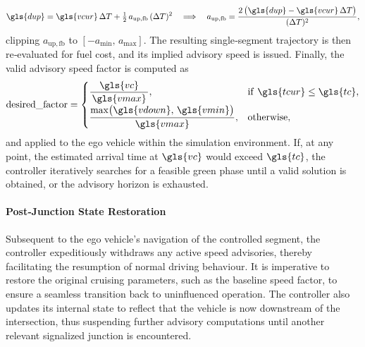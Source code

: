 \begin{equation}
    \gls{dup}
    = \gls{vcur}\,\Delta T 
    + \tfrac{1}{2}\,a_{\mathrm{up,fb}}\,(\Delta T)^2
    \quad\Longrightarrow\quad
    a_{\mathrm{up,fb}}
    = \frac{2\,\bigl(\gls{dup} - \gls{vcur}\,\Delta T\bigr)}{(\Delta T)^2},
\end{equation}
clipping $a_{\mathrm{up,fb}}$ to $[-a_{\min},\,a_{\max}]$. The resulting single‐segment trajectory is then re‐evaluated for fuel cost, and its implied advisory speed is issued.
\mynewline
Finally, the valid advisory speed factor is computed as
\begin{equation}
\text{desired\_factor} =
\begin{cases}
\dfrac{\gls{vc}}{\,\gls{vmax}\,}, 
& \text{if } \gls{tcur} \leq \gls{tc}, \\[6pt]
\dfrac{\max\bigl(\gls{vdown},\,\gls{vmin}\bigr)}{\,\gls{vmax}\,}, 
& \text{otherwise},
\end{cases}
\end{equation}
and applied to the ego vehicle within the simulation environment. If, at any point, the estimated arrival time at $\gls{vc}$ would exceed $\gls{tc}$, the controller iteratively searches for a feasible green phase until a valid solution is obtained, or the advisory horizon is exhausted.

\paragraph{Post‐Junction State Restoration}
Subsequent to the ego vehicle's navigation of the controlled segment, the controller expeditiously withdraws any active speed advisories, thereby facilitating the resumption of normal driving behaviour. It is imperative to restore the original cruising parameters, such as the baseline speed factor, to ensure a seamless transition back to uninfluenced operation. The controller also updates its internal state to reflect that the vehicle is now downstream of the intersection, thus suspending further advisory computations until another relevant signalized junction is encountered.


